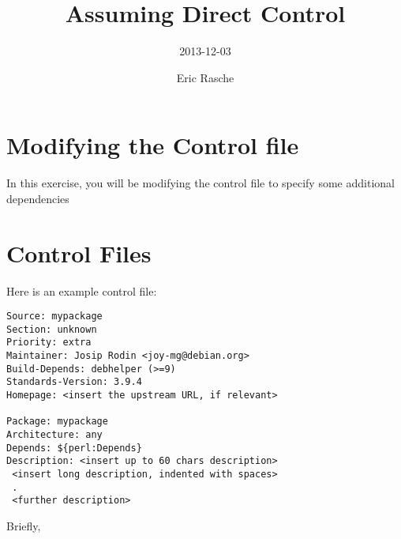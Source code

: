 \documentclass[]{article}
\title{Assuming Direct Control}
\author{2013-12-03}
\date{Eric Rasche}
\begin{document}
\maketitle

\section{Modifying the Control file}

In this exercise, you will be modifying the control file to specify some
additional dependencies

\section{Control Files}

Here is an example control file:

\begin{verbatim}
Source: mypackage
Section: unknown
Priority: extra
Maintainer: Josip Rodin <joy-mg@debian.org>
Build-Depends: debhelper (>=9)
Standards-Version: 3.9.4
Homepage: <insert the upstream URL, if relevant>

Package: mypackage
Architecture: any
Depends: ${perl:Depends}
Description: <insert up to 60 chars description>
 <insert long description, indented with spaces>
 . 
 <further description>
\end{verbatim}
Briefly,
\end{document}
